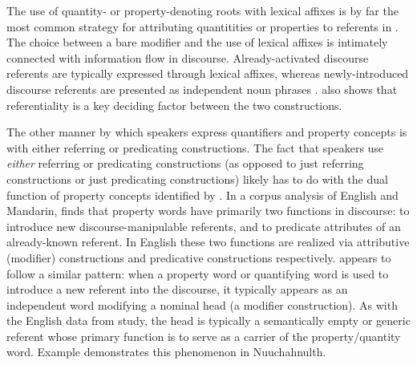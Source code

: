 \noindent The use of quantity- or property-denoting roots with lexical affixes is by far the most common strategy for attributing quantitities or properties to referents in . The choice between a bare modifier and the use of lexical affixes is intimately connected with information flow in discourse. Already-activated discourse referents are typically expressed through lexical affixes, whereas newly-introduced discourse referents are presented as independent noun phrases \parencite[887--889]{Mithun1984}. \textcite[144]{Nakayama2001} also shows that referentiality is a key deciding factor between the two constructions.

The other manner by which speakers express quantifiers and property concepts is with either referring or predicating constructions. The fact that speakers use \emph{either} referring or predicating constructions (as opposed to just referring constructions or just predicating constructions) likely has to do with the dual function of property concepts identified by \textcite{Thompson1989}. In a corpus analysis of English and Mandarin, \citeauthor{Thompson1989} finds that property words have primarily two functions in discourse: to introduce new discourse-manipulable referents, and to predicate attributes of an already-known referent. In English these two functions are realized via attributive (modifier) constructions and predicative constructions respectively.  appears to follow a similar pattern: when a property word or quantifying word is used to introduce a new referent into the discourse, it typically appears as an independent word modifying a nominal head (a modifier construction). As with the English data from  study, the head is typically a semantically empty or generic referent whose primary function is to serve as a carrier of the property/quantity word. Example  demonstrates this phenomenon in Nuuchahnulth.

